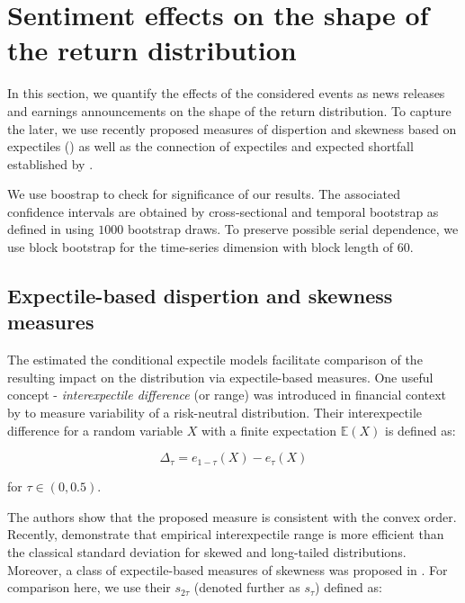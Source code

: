 \documentclass[]{article}
\begin{document}
\newpage
\hypertarget{quantifying-the-effects-on-the-shape-of-the-return-distribution}{%
\section{Sentiment effects on the shape of the return distribution}\label{quantifying-the-effects-on-the-shape-of-the-return-distribution}}

In this section, we quantify the effects of the considered events as news releases and earnings announcements on the shape of the return distribution. To capture the later, we use recently proposed measures of dispertion and skewness based on expectiles (\cite{eberl2022}) as well as the connection of expectiles and expected shortfall established by \cite{Taylor2008}.

We use boostrap to check for significance of our results. The associated confidence intervals are obtained by cross-sectional and temporal bootstrap as defined in \cite{Kapetanios2008} using \(1000\) bootstrap draws. To preserve possible serial dependence, we use block bootstrap for the time-series dimension with block length of \(60\).

\hypertarget{expectile-based-dispertion-and-skewness-measures}{%
\subsection{Expectile-based dispertion and skewness measures}\label{expectile-based-dispertion-and-skewness-measures}}

The estimated the conditional expectile models facilitate comparison of the resulting impact on the distribution via expectile-based measures. One useful concept - \emph{interexpectile difference} (or range) was introduced in financial context by \cite{bellini2018} to measure variability of a risk-neutral distribution. Their interexpectile difference for a random variable \(X\) with a finite expectation \(\mathbb E(X)\) is defined as:

\[\Delta_\tau = e_{1-\tau}(X) - e_\tau(X)\]

for \(\tau\in(0,0.5).\)

The authors show that the proposed measure is consistent with the convex order. Recently, \cite{eberl2022} demonstrate that empirical interexpectile range is more efficient than the classical standard deviation for skewed and long-tailed distributions. Moreover, a class of expectile-based measures of skewness was proposed in \cite{eberl2022sk}. For comparison here, we use their \(s_{2\tau}\) (denoted further as \(s_\tau\)) defined as:
\end{document}
